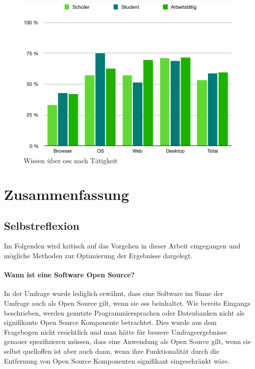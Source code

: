 \documentclass[a4paper]{article}
\begin{document}
            \begin{figure}
                \includegraphics[width=\textwidth]{assets/results/openSourceJudging/openSourceJudgingDetailedOSSOnlyByOccupation.pdf}
                \caption{Wissen über \gls{oss} nach Tätigkeit}
                \label{figure:knowledge_by_occupation}
            \end{figure}
            
    
    
    \clearpage
    \section{Zusammenfassung}
        \subsection{Selbstreflexion}
            Im Folgenden wird kritisch auf das Vorgehen in dieser Arbeit eingegangen und mögliche Methoden zur Optimierung der Ergebnisse dargelegt.
            \paragraph{Wann ist eine Software Open Source?}
                In der Umfrage wurde lediglich erwähnt, dass eine Software im Sinne der Umfrage auch als Open Source gilt, wenn sie \gls{oss} beinhaltet. Wie bereits Eingangs beschrieben, werden genutzte Programmiersprachen oder Datenbanken nicht als signifikante Open Source Komponente betrachtet. Dies wurde aus dem Fragebogen nicht ersichtlich und man hätte für bessere Umfrageergebnisse genauer spezifizieren müssen, dass eine Anwendung als Open Source gilt, wenn sie selbst quelloffen ist aber auch dann, wenn ihre Funktionalität durch die Entfernung von Open Source Komponenten signifikant eingeschränkt wäre.
                
\end{document}
